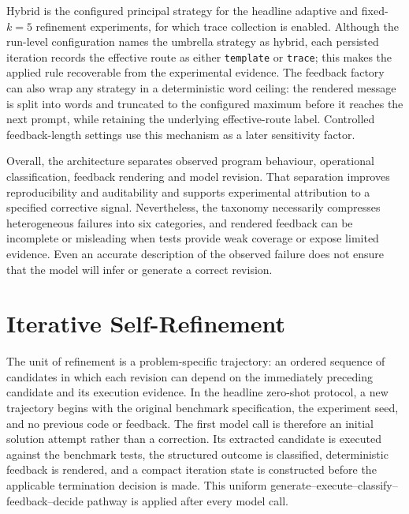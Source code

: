 Hybrid is the configured principal strategy for the headline adaptive and fixed-$k=5$ refinement experiments, for which trace collection is enabled. Although the run-level configuration names the umbrella strategy as hybrid, each persisted iteration records the effective route as either \texttt{template} or \texttt{trace}; this makes the applied rule recoverable from the experimental evidence. The feedback factory can also wrap any strategy in a deterministic word ceiling: the rendered message is split into words and truncated to the configured maximum before it reaches the next prompt, while retaining the underlying effective-route label. Controlled feedback-length settings use this mechanism as a later sensitivity factor.

Overall, the architecture separates observed program behaviour, operational classification, feedback rendering and model revision. That separation improves reproducibility and auditability and supports experimental attribution to a specified corrective signal. Nevertheless, the taxonomy necessarily compresses heterogeneous failures into six categories, and rendered feedback can be incomplete or misleading when tests provide weak coverage or expose limited evidence. Even an accurate description of the observed failure does not ensure that the model will infer or generate a correct revision.

\section{Iterative Self-Refinement}

The unit of refinement is a problem-specific trajectory: an ordered sequence of candidates in which each revision can depend on the immediately preceding candidate and its execution evidence. In the headline zero-shot protocol, a new trajectory begins with the original benchmark specification, the experiment seed, and no previous code or feedback. The first model call is therefore an initial solution attempt rather than a correction. Its extracted candidate is executed against the benchmark tests, the structured outcome is classified, deterministic feedback is rendered, and a compact iteration state is constructed before the applicable termination decision is made. This uniform generate--execute--classify--feedback--decide pathway is applied after every model call.

